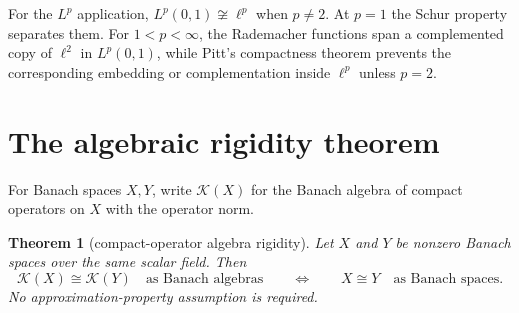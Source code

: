 \documentclass[11pt]{article}
\newtheorem{theorem}{Theorem}
\newcommand{\Kop}{\mathcal K}
\begin{document}
For the $L^p$ application, $L^p(0,1)\not\cong\ell^p$ when $p\ne2$.  At
$p=1$ the Schur property separates them.  For $1<p<\infty$, the Rademacher
functions span a complemented copy of $\ell^2$ in $L^p(0,1)$, while Pitt's
compactness theorem prevents the corresponding embedding or complementation
inside $\ell^p$ unless $p=2$.

\section{The algebraic rigidity theorem}

For Banach spaces $X,Y$, write $\Kop(X)$ for the Banach algebra of compact
operators on $X$ with the operator norm.

\begin{theorem}[compact-operator algebra rigidity]\label{thm:rigidity}
Let $X$ and $Y$ be nonzero Banach spaces over the same scalar field.  Then
\[
  \Kop(X)\cong\Kop(Y)\quad\text{as Banach algebras}
  \qquad\Longleftrightarrow\qquad
  X\cong Y\quad\text{as Banach spaces}.
\]
No approximation-property assumption is required.
\end{theorem}
\end{document}
